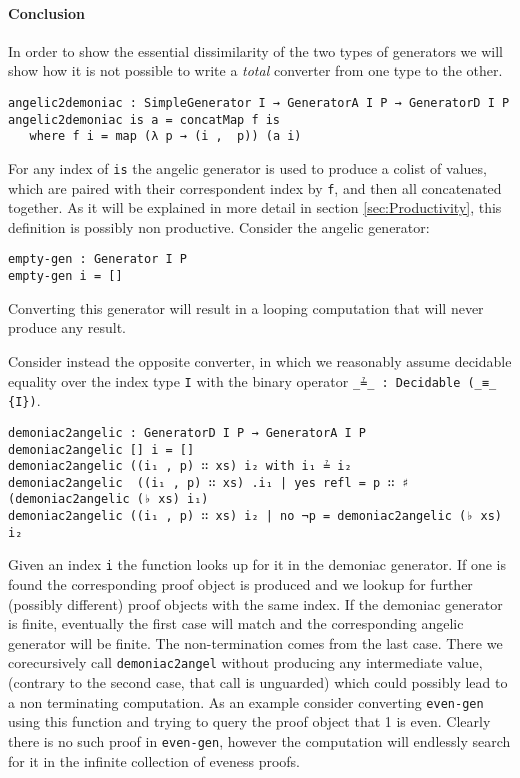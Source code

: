 \documentclass[10pt,a4paper]{article}
\begin{document}
\paragraph{Conclusion}
In order to show the essential dissimilarity of the two types of generators we will show how it is not possible to write a \emph{total} converter from one type to the other.
\begin{verbatim}
angelic2demoniac : SimpleGenerator I → GeneratorA I P → GeneratorD I P
angelic2demoniac is a = concatMap f is
   where f i = map (λ p → (i ,  p)) (a i) 
\end{verbatim}
For any index of \texttt{is} the angelic generator is used to produce a colist of 
values, which are paired with their correspondent index by \texttt{f}, and then all concatenated together.
As it will be explained in more detail in section \ref{sec:Productivity}, this definition is possibly non productive. Consider the angelic generator:
\begin{verbatim}
empty-gen : Generator I P
empty-gen i = [] 
\end{verbatim}
Converting this generator will result in a looping computation that will never produce any result.

Consider instead the opposite converter, in which we reasonably assume decidable equality over the index type \texttt{I} with the binary operator \texttt{\_≟\_ :\ Decidable (\_≡\_  \{I\})}.
\begin{verbatim}
demoniac2angelic : GeneratorD I P → GeneratorA I P
demoniac2angelic [] i = []
demoniac2angelic ((i₁ , p) ∷ xs) i₂ with i₁ ≟ i₂
demoniac2angelic  ((i₁ , p) ∷ xs) .i₁ | yes refl = p ∷ ♯ (demoniac2angelic (♭ xs) i₁)
demoniac2angelic ((i₁ , p) ∷ xs) i₂ | no ¬p = demoniac2angelic (♭ xs) i₂
\end{verbatim}
Given an index \texttt{i} the function looks up for it in the demoniac generator. If one is found the corresponding proof object is produced and we lookup for further (possibly different) proof objects with the same index.
If the demoniac generator is finite, eventually the first case will match and the corresponding angelic generator will be finite. The non-termination comes from the last case. There we corecursively call \texttt{demoniac2angel} without producing any intermediate value, (contrary to the second case, that call is unguarded) which could possibly lead to a non terminating computation.
As an example consider converting \texttt{even-gen} using this function and trying to query the proof object that 1 is even. Clearly there is no such proof in \texttt{even-gen}, however the computation will endlessly search for it in the infinite collection of eveness proofs.  
 
\end{document}
